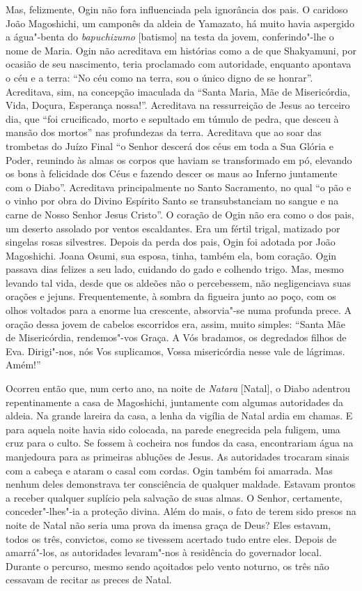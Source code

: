 Mas, felizmente, Ogin não fora influenciada pela ignorância dos pais. O
caridoso João Magoshichi, um camponês da aldeia de Yamazato, há muito
havia aspergido a água"-benta do \textit{bapuchizumo} [batismo] na testa
da jovem, conferindo"-lhe o nome de Maria. Ogin não acreditava em
histórias como a de que Shakyamuni, por ocasião de seu nascimento,
teria proclamado com autoridade, enquanto apontava o céu e a terra: ``No
céu como na terra, sou o único digno de se honrar''. Acreditava, sim,
na concepção imaculada da ``Santa Maria, Mãe de Misericórdia, Vida,
Doçura, Esperança nossa!''. Acreditava na ressurreição de Jesus ao
terceiro dia, que ``foi crucificado, morto e sepultado em túmulo de
pedra, que desceu à mansão dos mortos'' nas profundezas da terra.
Acreditava que ao soar das trombetas do Juízo Final ``o Senhor descerá
dos céus em toda a Sua Glória e Poder, reunindo às almas os corpos que
haviam se transformado em pó, elevando os bons à felicidade dos Céus e
fazendo descer os maus ao Inferno juntamente com o Diabo''. Acreditava
principalmente no Santo Sacramento, no qual ``o pão e o vinho por obra
do Divino Espírito Santo se transubstanciam no sangue e na carne de
Nosso Senhor Jesus Cristo''. O coração de Ogin não era como o dos pais,
um deserto assolado por ventos escaldantes. Era um fértil trigal,
matizado por singelas rosas silvestres. Depois da perda dos pais, Ogin
foi adotada por João Magoshichi. Joana Osumi, sua esposa, tinha, também
ela, bom coração. Ogin passava dias felizes a seu lado, cuidando do
gado e colhendo trigo. Mas, mesmo levando tal vida, desde que os
aldeões não o percebessem, não negligenciava suas orações e jejuns.
Frequentemente, à sombra da figueira junto ao poço, com os olhos
voltados para a enorme lua crescente, absorvia"-se numa profunda prece.
A oração dessa jovem de cabelos escorridos era, assim, muito simples:
``Santa Mãe de Misericórdia, rendemos"-vos Graça. A Vós bradamos, os
degredados filhos de Eva. Dirigi"-nos, nós Vos suplicamos, Vossa
misericórdia nesse vale de lágrimas. Amém!''

Ocorreu então que, num certo ano, na noite de \textit{Natara} [Natal], 
o Diabo adentrou repentinamente a casa de
Magoshichi, juntamente com algumas autoridades da aldeia. Na grande
lareira da casa, a lenha da vigília de Natal ardia em chamas. E para
aquela noite havia sido colocada, na parede enegrecida pela fuligem,
uma cruz para o culto. Se fossem à cocheira nos fundos da casa,
encontrariam água na manjedoura para as primeiras abluções de Jesus. As
autoridades trocaram sinais com a cabeça e ataram o casal com cordas.
Ogin também foi amarrada. Mas nenhum deles demonstrava ter consciência
de qualquer maldade. Estavam prontos a receber qualquer suplício pela
salvação de suas almas. O Senhor, certamente, conceder"-lhes"-ia a
proteção divina. Além do mais, o fato de terem sido presos na noite de
Natal não seria uma prova da imensa graça de Deus? Eles estavam, todos
os três, convictos, como se tivessem acertado tudo entre eles. Depois
de amarrá"-los, as autoridades levaram"-nos à residência do governador
local. Durante o percurso, mesmo sendo açoitados pelo vento noturno, os
três não cessavam de recitar as preces de Natal.

